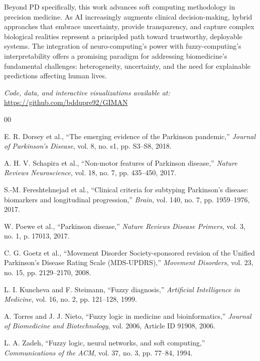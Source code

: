 \documentclass[conference]{IEEEtran}
\begin{document}
Beyond PD specifically, this work advances soft computing methodology in precision medicine. As AI increasingly augments clinical decision-making, hybrid approaches that embrace uncertainty, provide transparency, and capture complex biological realities represent a principled path toward trustworthy, deployable systems. The integration of neuro-computing's power with fuzzy-computing's interpretability offers a promising paradigm for addressing biomedicine's fundamental challenges: heterogeneity, uncertainty, and the need for explainable predictions affecting human lives.

\textit{Code, data, and interactive visualizations available at:} \url{https://github.com/bddupre92/GIMAN}

\begin{thebibliography}{00}

E. R. Dorsey et al., ``The emerging evidence of the Parkinson pandemic,'' \textit{Journal of Parkinson's Disease}, vol. 8, no. s1, pp. S3--S8, 2018.

A. H. V. Schapira et al., ``Non-motor features of Parkinson disease,'' \textit{Nature Reviews Neuroscience}, vol. 18, no. 7, pp. 435--450, 2017.

S.-M. Fereshtehnejad et al., ``Clinical criteria for subtyping Parkinson's disease: biomarkers and longitudinal progression,'' \textit{Brain}, vol. 140, no. 7, pp. 1959--1976, 2017.

W. Poewe et al., ``Parkinson disease,'' \textit{Nature Reviews Disease Primers}, vol. 3, no. 1, p. 17013, 2017.

C. G. Goetz et al., ``Movement Disorder Society-sponsored revision of the Unified Parkinson's Disease Rating Scale (MDS-UPDRS),'' \textit{Movement Disorders}, vol. 23, no. 15, pp. 2129--2170, 2008.

L. I. Kuncheva and F. Steimann, ``Fuzzy diagnosis,'' \textit{Artificial Intelligence in Medicine}, vol. 16, no. 2, pp. 121--128, 1999.

A. Torres and J. J. Nieto, ``Fuzzy logic in medicine and bioinformatics,'' \textit{Journal of Biomedicine and Biotechnology}, vol. 2006, Article ID 91908, 2006.

L. A. Zadeh, ``Fuzzy logic, neural networks, and soft computing,'' \textit{Communications of the ACM}, vol. 37, no. 3, pp. 77--84, 1994.


\end{thebibliography}
\end{document}
